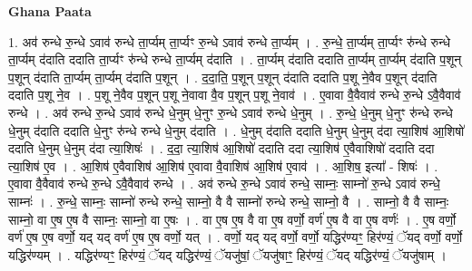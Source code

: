 \documentclass[17pt]{extarticle}
\begin{document}
\textbf{Ghana Paata } \newline

1. अव॑ रुन्धे रु॒न्धे ऽवाव॑ रुन्धे ता॒र्प्यम् ता॒र्प्यꣳ रु॒न्धे ऽवाव॑ रुन्धे ता॒र्प्यम् । . रु॒न्धे॒ ता॒र्प्यम् ता॒र्प्यꣳ रु॑न्धे रुन्धे ता॒र्प्यम् द॑दाति ददाति ता॒र्प्यꣳ रु॑न्धे रुन्धे ता॒र्प्यम् द॑दाति । . ता॒र्प्यम् द॑दाति ददाति ता॒र्प्यम् ता॒र्प्यम् द॑दाति प॒शून् प॒शून् द॑दाति ता॒र्प्यम् ता॒र्प्यम् द॑दाति प॒शून् । . द॒दा॒ति॒ प॒शून् प॒शून् द॑दाति ददाति प॒शू ने॒वैव प॒शून् द॑दाति ददाति प॒शू ने॒व । . प॒शू ने॒वैव प॒शून् प॒शू ने॒वावा वै॒व प॒शून् प॒शू ने॒वाव॑ । . ए॒वावा वै॒वैवाव॑ रुन्धे रु॒न्धे ऽवै॒वैवाव॑ रुन्धे । . अव॑ रुन्धे रु॒न्धे ऽवाव॑ रुन्धे धे॒नुम् धे॒नुꣳ रु॒न्धे ऽवाव॑ रुन्धे धे॒नुम् । . रु॒न्धे॒ धे॒नुम् धे॒नुꣳ रु॑न्धे रुन्धे धे॒नुम् द॑दाति ददाति धे॒नुꣳ रु॑न्धे रुन्धे धे॒नुम् द॑दाति । . धे॒नुम् द॑दाति ददाति धे॒नुम् धे॒नुम् द॑दा त्या॒शिष॑ आ॒शिषो॑ ददाति धे॒नुम् धे॒नुम् द॑दा त्या॒शिषः॑ । . द॒दा॒ त्या॒शिष॑ आ॒शिषो॑ ददाति ददा त्या॒शिष॑ ए॒वैवाशिषो॑ ददाति ददा त्या॒शिष॑ ए॒व । . आ॒शिष॑ ए॒वैवाशिष॑ आ॒शिष॑ ए॒वावा वै॒वाशिष॑ आ॒शिष॑ ए॒वाव॑ । . आ॒शिष॒ इत्या᳚ - शिषः॑ । . ए॒वावा वै॒वैवाव॑ रुन्धे रु॒न्धे ऽवै॒वैवाव॑ रुन्धे । . अव॑ रुन्धे रु॒न्धे ऽवाव॑ रुन्धे॒ साम्नः॒ साम्नो॑ रु॒न्धे ऽवाव॑ रुन्धे॒ साम्नः॑ । . रु॒न्धे॒ साम्नः॒ साम्नो॑ रुन्धे रुन्धे॒ साम्नो॒ वै वै साम्नो॑ रुन्धे रुन्धे॒ साम्नो॒ वै । . साम्नो॒ वै वै साम्नः॒ साम्नो॒ वा ए॒ष ए॒ष वै साम्नः॒ साम्नो॒ वा ए॒षः । . वा ए॒ष ए॒ष वै वा ए॒ष वर्णो॒ वर्ण॑ ए॒ष वै वा ए॒ष वर्णः॑ । . ए॒ष वर्णो॒ वर्ण॑ ए॒ष ए॒ष वर्णो॒ यद् यद् वर्ण॑ ए॒ष ए॒ष वर्णो॒ यत् । . वर्णो॒ यद् यद् वर्णो॒ वर्णो॒ यद्धिर॑ण्यꣳ॒॒ हिर॑ण्यं॒ ॅयद् वर्णो॒ वर्णो॒ यद्धिर॑ण्यम् । . यद्धिर॑ण्यꣳ॒॒ हिर॑ण्यं॒ ॅयद् यद्धिर॑ण्यं॒ ॅयजु॑षां॒ ॅयजु॑षाꣳ॒॒ हिर॑ण्यं॒ ॅयद् यद्धिर॑ण्यं॒ ॅयजु॑षाम् । \newline
\end{document}
